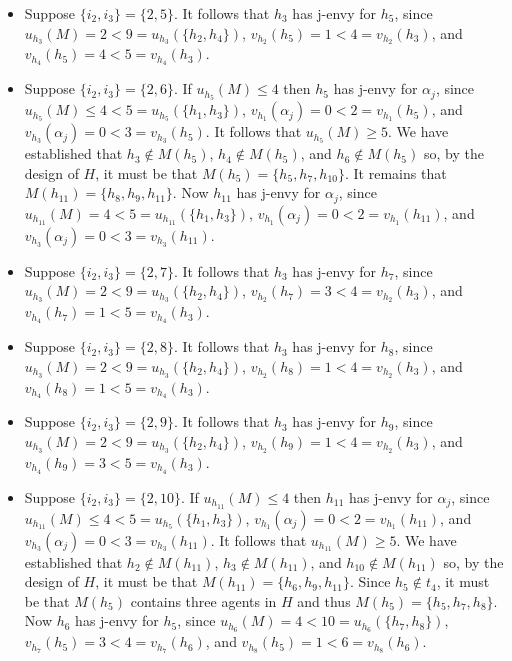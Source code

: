 \begin{itemize}
\begin{itemize}
    \item Suppose $\{ i_2, i_3 \} = \{ 2, 5 \}$. It follows that $h_3$ has j-envy for $h_5$, since $u_{h_3}(M) = 2 < 9 = u_{h_3}(\{ h_2, h_4 \})$, $v_{h_2}(h_5) = 1 < 4 = v_{h_2}(h_3)$, and $v_{h_4}(h_5) = 4 < 5 = v_{h_4}(h_3)$.
    \item Suppose $\{ i_2, i_3 \} = \{ 2, 6 \}$. If $u_{h_5}(M) \leq 4$ then $h_5$ has j-envy for $\alpha_{j}$, since $u_{h_5}(M) \leq 4 < 5 = u_{h_5}(\{ h_1, h_3 \})$, $v_{h_1}(\alpha_{j}) = 0 < 2 = v_{h_1}(h_5)$, and $v_{h_3}(\alpha_{j}) = 0 < 3 = v_{h_3}(h_5)$. It follows that $u_{h_5}(M) \geq 5$. We have established that $h_3 \notin M(h_5)$, $h_4 \notin M(h_5)$, and $h_6 \notin M(h_5)$ so, by the design of $H$, it must be that $M(h_5) = \{ h_5, h_7, h_{10} \}$. It remains that $M(h_{11}) = \{ h_8, h_9, h_{11} \}$. Now $h_{11}$ has j-envy for $\alpha_{j}$, since $u_{h_{11}}(M) = 4 < 5 = u_{h_{11}}(\{ h_1, h_3 \})$, $v_{h_1}(\alpha_{j}) = 0 < 2 = v_{h_1}(h_{11})$, and $v_{h_3}(\alpha_{j}) = 0 < 3 = v_{h_3}(h_{11})$.
    \item Suppose $\{ i_2, i_3 \} = \{ 2, 7 \}$. It follows that $h_3$ has j-envy for $h_7$, since $u_{h_3}(M) = 2 < 9 = u_{h_3}(\{ h_2, h_4 \})$, $v_{h_2}(h_7) = 3 < 4 = v_{h_2}(h_3)$, and $v_{h_4}(h_7) = 1 < 5 = v_{h_4}(h_3)$.
    \item Suppose $\{ i_2, i_3 \} = \{ 2, 8 \}$. It follows that $h_3$ has j-envy for $h_8$, since $u_{h_3}(M) = 2 < 9 = u_{h_3}(\{ h_2, h_4 \})$, $v_{h_2}(h_8) = 1 < 4 = v_{h_2}(h_3)$, and $v_{h_4}(h_8) = 1 < 5 = v_{h_4}(h_3)$.
    \item Suppose $\{ i_2, i_3 \} = \{ 2, 9 \}$. It follows that $h_3$ has j-envy for $h_9$, since $u_{h_3}(M) = 2 < 9 = u_{h_3}(\{ h_2, h_4 \})$, $v_{h_2}(h_9) = 1 < 4 = v_{h_2}(h_3)$, and $v_{h_4}(h_9) = 3 < 5 = v_{h_4}(h_3)$.
    \item Suppose $\{ i_2, i_3 \} = \{ 2, 10 \}$. If $u_{h_{11}}(M) \leq 4$ then $h_{11}$ has j-envy for $\alpha_{j}$, since $u_{h_{11}}(M) \leq 4 < 5 = u_{h_5}(\{ h_1, h_3 \})$, $v_{h_1}(\alpha_{j}) = 0 < 2 = v_{h_1}(h_{11})$, and $v_{h_3}(\alpha_{j}) = 0 < 3 = v_{h_3}(h_{11})$. It follows that $u_{h_{11}}(M) \geq 5$. We have established that $h_2 \notin M(h_{11})$, $h_3 \notin M(h_{11})$, and $h_{10} \notin M(h_{11})$ so, by the design of $H$, it must be that $M(h_{11}) = \{ h_6, h_9, h_{11} \}$. Since $h_5 \notin t_4$, it must be that $M(h_5)$ contains three agents in $H$ and thus $M(h_5) = \{ h_5, h_7, h_8 \}$. Now $h_6$ has j-envy for $h_5$, since $u_{h_6}(M) = 4 < 10 = u_{h_6}(\{ h_7, h_8 \})$, $v_{h_7}(h_5) = 3 < 4 = v_{h_7}(h_6)$, and $v_{h_8}(h_5) = 1 < 6 = v_{h_8}(h_6)$.

\end{itemize}
\end{itemize}
